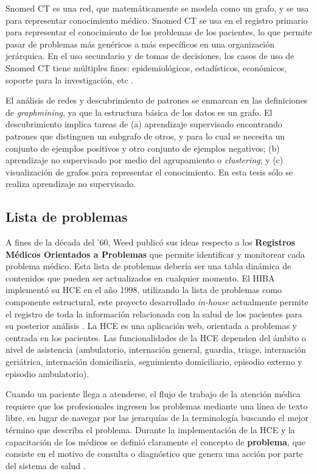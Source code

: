 Snomed CT es una red, que matemáticamente se modela como un grafo, y se usa para representar conocimiento médico. Snomed CT se usa en el registro primario para representar el conocimiento de los problemas de los pacientes, lo que permite pasar de problemas más genéricos a más específicos en una organización jerárquica. En el uso secundario y de tomas de decisiones, los casos de uso de Snomed CT tiene múltiples fines: epidemiológicos, estadísticos, económicos, soporte para la investigación, etc \cite{Lee2014LiteratureUse}. 

El análisis de redes y descubrimiento de patrones se enmarcan en las definiciones de \textit{graphmining}, ya que la estructura básica de los datos es un grafo. El descubrimiento implica tareas de (a) aprendizaje supervisado encontrando patrones que distinguen un subgrafo de otros, y para lo cual se necesita un conjunto de ejemplos positivos y otro conjunto de ejemplos negativos; (b) aprendizaje no supervisado por medio del agrupamiento o \textit{clustering}; y (c) visualización de grafos para representar el conocimiento. En esta tesis sólo se realiza aprendizaje no supervisado. 


\subsection{Lista de problemas}
A fines de la década del '60, Weed \cite{Weed1968} publicó sus ideas respecto a los \textbf{Registros Médicos Orientados a Problemas} que permite identificar y monitorear cada problema médico. Esta lista de problemas debería ser una tabla dinámica de contenidos que pueden ser actualizados en cualquier momento. El HIBA implementó su \acrfull{HCE} en el año 1998, utilizando la lista de problemas como componente estructural, este proyecto desarrollado \textit{in-house} actualmente permite el registro de toda la información relacionada con la salud de los pacientes para su posterior análisis \cite{Luna2013,luna2003implementacion}. La \acrshort{HCE} es una aplicación web, orientada a problemas y centrada en los pacientes. Las funcionalidades de la \acrshort{HCE} dependen del ámbito o nivel de asistencia (ambulatorio, internación general, guardia, triage, internación geriátrica, internación domiciliaria, seguimiento domiciliario, episodio externo y episodio ambulatorio).
 
Cuando un paciente llega a atenderse, el flujo de trabajo de la atención médica requiere que los profesionales ingresen los problemas mediante una línea de texto libre, en lugar de navegar por las jerarquías de la terminología buscando el mejor término que describa el problema. Durante la implementación de la \acrshort{HCE} y la capacitación de los médicos se definió claramente el concepto de \textbf{problema}, que consiste en el motivo de consulta o diagnóstico que
genera una acción por parte del sistema de salud \cite{lopez2004codificacion}.

